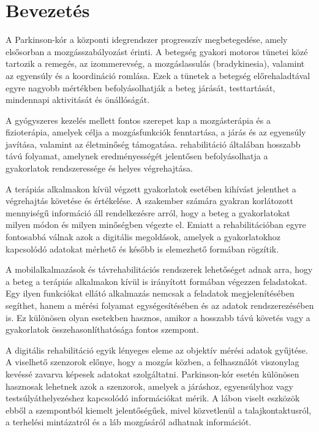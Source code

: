 \section{Bevezetés}

A Parkinson-kór a központi idegrendszer progresszív megbetegedése, amely elsősorban a
mozgásszabályozást érinti. A betegség gyakori motoros tünetei közé tartozik a remegés,
az izommerevség, a mozgáslassulás (bradykinesia), valamint az egyensúly és a koordináció romlása. \cite{author2025physiotherapy}
Ezek a tünetek a betegség előrehaladtával egyre nagyobb mértékben befolyásolhatják a
beteg járását, testtartását, mindennapi aktivitását és önállóságát.

A gyógyszeres kezelés mellett fontos szerepet kap a mozgásterápia és a fizioterápia,
amelyek célja a mozgásfunkciók fenntartása, a járás és az egyensúly javítása, valamint az
életminőség támogatása.\cite{osborne2022physical} rehabilitáció általában hosszabb távú folyamat,
amelynek eredményességét jelentősen befolyásolhatja a gyakorlatok rendszeressége
és helyes végrehajtása.


A terápiás alkalmakon kívül végzett gyakorlatok esetében kihívást jelenthet a végrehajtás
követése és értékelése. A szakember számára gyakran korlátozott mennyiségű információ áll
rendelkezésre arról, hogy a beteg a gyakorlatokat milyen módon és milyen minőségben végezte el.
Emiatt a rehabilitációban egyre fontosabbá válnak azok a digitális megoldások,
amelyek a gyakorlatokhoz kapcsolódó adatokat mérhető és később is elemezhető formában rögzítik.
\cite{rossi2022parkinson}


A mobilalkalmazások és távrehabilitációs rendszerek lehetőséget adnak arra, hogy a beteg a
terápiás alkalmakon kívül is irányított formában végezzen feladatokat.
Egy ilyen funkciókat ellátó alkalmazás nemcsak a feladatok megjelenítésében segíthet,
hanem a mérési folyamat egységesítésében és az adatok rendszerezésében is.
Ez különösen olyan esetekben hasznos, amikor a hosszabb távú követés vagy a
gyakorlatok összehasonlíthatósága fontos szempont. \cite{chen2024application}


A digitális rehabilitáció egyik lényeges eleme az objektív mérési adatok gyűjtése.
A viselhető szenzorok előnye, hogy a mozgás közben, a felhasználót viszonylag kevéssé
zavarva képesek adatokat szolgáltatni. \cite{paci2020design} Parkinson-kór esetén különösen hasznosak lehetnek azok
a szenzorok, amelyek a járáshoz, egyensúlyhoz vagy testsúlyáthelyezéshez kapcsolódó információkat
mérik. A lábon viselt eszközök ebből a szempontból kiemelt jelentőségűek, mivel közvetlenül a
talajkontaktusról, a terhelési mintázatról és a láb mozgásáról adhatnak információt.


